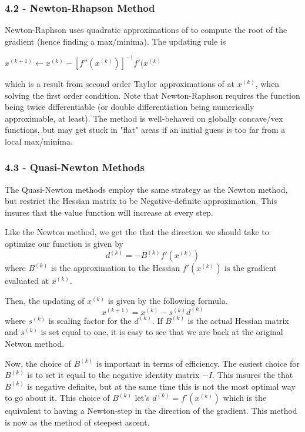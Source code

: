 \documentclass{article}
\begin{document}
\subsubsection*{4.2 - Newton-Rhapson Method}

Newton-Raphson uses quadratic approximations of  to compute the root of the gradient (hence finding a max/minima). The updating rule is 

$ x^{(k+1)} \leftarrow x^{(k)} - [f''(x^{(k)})]^{-1}f'(x^{(k)}$

which is a result from second order Taylor approximations of  at $x^{(k)}$, when solving the first order condition. Note that Newton-Raphson requires the function being twice differentiable (or double differentiation being numerically approximable, at least). The method is well-behaved on globally concave/vex functions, but may get stuck in "flat" areas if an initial guess is too far from a local max/minima. 

\subsubsection*{4.3 - Quasi-Newton Methods}


The Quasi-Newton methods employ the same strategy as the Newton method, but restrict the Hessian matrix to be Negative-definite approximation. This insures that the value function will increase at every step.

Like the Newton method, we get the that the direction we should take to optimize our function is given by
$$
d^{(k)}= - B^{(k)}f'(x^{(k)})
$$
where $B^{(k)}$ is the approximation to the Hessian $f'(x^{(k)})$ is the gradient evaluated at $x^{(k)}$.

Then, the updating of $x^{(k)}$ is given by the following formula.
$$
x^{(k+1)}= x^{(k)}-s^{(k)}d^{(k)}
$$
where $s^{(k)}$ is scaling factor for the $d^{(k)}$. If $B^{(k)}$ is the actual Hessian matrix and $s^{(k)}$ is set equal to one, it is easy to see that we are back at the original Netwon method.

Now, the choice of $B^{(k)}$ is important in terms of efficiency. The easiest choice for $B^{(k)}$ is to set it equal to the negative identity matrix $-I$. This insures the that $B^{(k)}$ is negative definite, but at the same time this is not the most optimal way to go about it. This choice of $B^{(k)}$ let's $d^{(k)}= f'(x^{(k)})$ which is the equivalent to having a Newton-step in the direction of the gradient. This method is now as the method of steepest ascent. 
\end{document}
